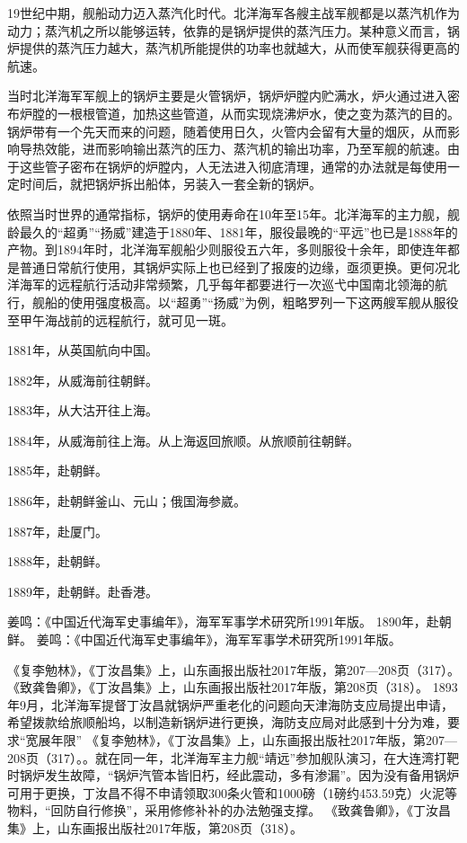 \documentclass[12pt,UTF8]{ctexbook}
\begin{document}
19世纪中期，舰船动力迈入蒸汽化时代。北洋海军各艘主战军舰都是以蒸汽机作为动力；蒸汽机之所以能够运转，依靠的是锅炉提供的蒸汽压力。某种意义而言，锅炉提供的蒸汽压力越大，蒸汽机所能提供的功率也就越大，从而使军舰获得更高的航速。

当时北洋海军军舰上的锅炉主要是火管锅炉，锅炉炉膛内贮满水，炉火通过进入密布炉膛的一根根管道，加热这些管道，从而实现烧沸炉水，使之变为蒸汽的目的。锅炉带有一个先天而来的问题，随着使用日久，火管内会留有大量的烟灰，从而影响导热效能，进而影响输出蒸汽的压力、蒸汽机的输出功率，乃至军舰的航速。由于这些管子密布在锅炉的炉膛内，人无法进入彻底清理，通常的办法就是每使用一定时间后，就把锅炉拆出船体，另装入一套全新的锅炉。

依照当时世界的通常指标，锅炉的使用寿命在10年至15年。北洋海军的主力舰，舰龄最久的“超勇”“扬威”建造于1880年、1881年，服役最晚的“平远”也已是1888年的产物。到1894年时，北洋海军舰船少则服役五六年，多则服役十余年，即使连年都是普通日常航行使用，其锅炉实际上也已经到了报废的边缘，亟须更换。更何况北洋海军的远程航行活动非常频繁，几乎每年都要进行一次巡弋中国南北领海的航行，舰船的使用强度极高。以“超勇”“扬威”为例，粗略罗列一下这两艘军舰从服役至甲午海战前的远程航行，就可见一斑。

1881年，从英国航向中国。

1882年，从威海前往朝鲜。

1883年，从大沽开往上海。

1884年，从威海前往上海。从上海返回旅顺。从旅顺前往朝鲜。

1885年，赴朝鲜。

1886年，赴朝鲜釜山、元山；俄国海参崴。

1887年，赴厦门。

1888年，赴朝鲜。

1889年，赴朝鲜。赴香港。

姜鸣：《中国近代海军史事编年》，海军军事学术研究所1991年版。
1890年，赴朝鲜。 姜鸣：《中国近代海军史事编年》，海军军事学术研究所1991年版。

《复李勉林》，《丁汝昌集》上，山东画报出版社2017年版，第207—208页（317）。
《致龚鲁卿》，《丁汝昌集》上，山东画报出版社2017年版，第208页（318）。
1893年9月，北洋海军提督丁汝昌就锅炉严重老化的问题向天津海防支应局提出申请，希望拨款给旅顺船坞，以制造新锅炉进行更换，海防支应局对此感到十分为难，要求“宽展年限” 《复李勉林》，《丁汝昌集》上，山东画报出版社2017年版，第207—208页（317）。。就在同一年，北洋海军主力舰“靖远”参加舰队演习，在大连湾打靶时锅炉发生故障，“锅炉汽管本皆旧朽，经此震动，多有渗漏”。因为没有备用锅炉可用于更换，丁汝昌不得不申请领取300条火管和1000磅（1磅约453.59克）火泥等物料，“回防自行修换”，采用修修补补的办法勉强支撑。 《致龚鲁卿》，《丁汝昌集》上，山东画报出版社2017年版，第208页（318）。
\end{document}

